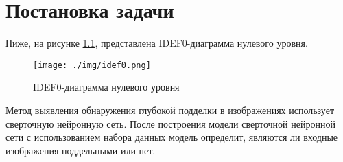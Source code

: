 \chapter{Постановка задачи}

Ниже, на рисунке \ref{idef}, представлена IDEF0-диаграмма нулевого уровня.

\captionsetup{justification=centering,singlelinecheck=off}
\begin{figure}[h!]
	\centering
		\texttt{[image: ./img/idef0.png]}
		\caption{IDEF0-диаграмма нулевого уровня}  
		\label{idef}
\end{figure}

Метод выявления обнаружения глубокой подделки в изображениях использует сверточную нейронную сеть. После построения модели сверточной нейронной сети с использованием набора данных модель определит, являются ли входные изображения поддельными или нет.